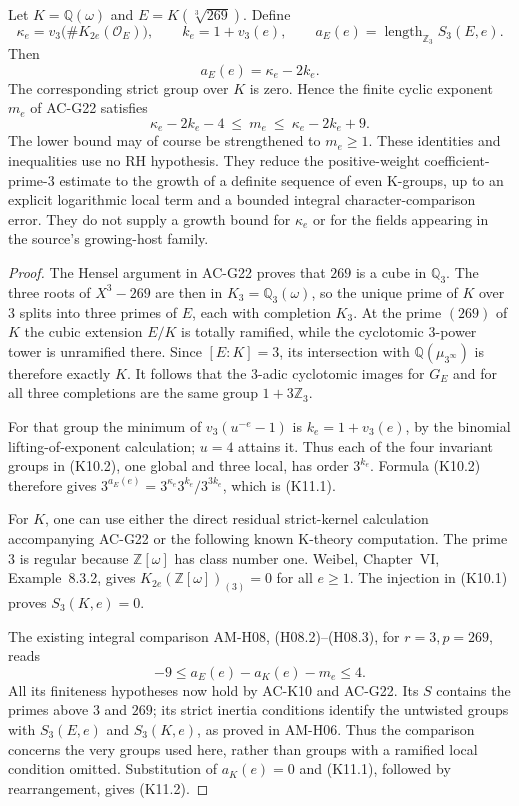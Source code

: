 \begin{proposition}
\label{AC-K11}
Let $K=\mathbb Q(\omega)$ and $E=K(\sqrt[3]{269})$.  Define
\[
 \kappa_e=v_3\bigl(\#K_{2e}(\mathcal O_E)\bigr),\qquad
 k_e=1+v_3(e),\qquad
 a_E(e)=\operatorname{length}_{\mathbb Z_3}S_3(E,e).
\]
Then
\[
                a_E(e)=\kappa_e-2k_e.                  \tag{K11.1}
\]
The corresponding strict group over $K$ is zero.  Hence the
finite cyclic exponent $m_e$ of AC-G22 satisfies
\[
 \kappa_e-2k_e-4\ \leq\ m_e\ \leq\
                       \kappa_e-2k_e+9.               \tag{K11.2}
\]
The lower bound may of course be strengthened to $m_e\geq1$.
These identities and inequalities use no RH hypothesis.
They reduce the positive-weight coefficient-prime-$3$ estimate
to the growth of a definite sequence of even K-groups, up to
an explicit logarithmic local term and a bounded integral
character-comparison error.  They do not supply a growth bound
for $\kappa_e$ or for the fields appearing in the source's
growing-host family.
\end{proposition}
\begin{proof}
The Hensel argument in AC-G22 proves that $269$ is a cube in
$\mathbb Q_3$.  The three roots of $X^3-269$ are then in
$K_3=\mathbb Q_3(\omega)$, so the unique prime of $K$ over $3$
splits into three primes of $E$, each with completion $K_3$.
At the prime $(269)$ of $K$ the cubic extension $E/K$ is
totally ramified, while the cyclotomic $3$-power tower is
unramified there.  Since $[E:K]=3$, its intersection with
$\mathbb Q(\mu_{3^\infty})$ is therefore exactly $K$.
It follows that the $3$-adic cyclotomic images for $G_E$ and
for all three completions are the same group
$1+3\mathbb Z_3$.

For that group the minimum of
$v_3(u^{-e}-1)$ is $k_e=1+v_3(e)$, by the binomial
lifting-of-exponent calculation; $u=4$ attains it.
Thus each of the four invariant groups in (K10.2), one global
and three local, has order $3^{k_e}$.  Formula (K10.2)
therefore gives
$3^{a_E(e)}=3^{\kappa_e}3^{k_e}/3^{3k_e}$,
which is (K11.1).

For $K$, one can use either the direct residual strict-kernel
calculation accompanying AC-G22 or the following known
K-theory computation.  The prime $3$ is regular because
$\mathbb Z[\omega]$ has class number one.  Weibel, Chapter~VI,
Example~8.3.2, gives
$K_{2e}(\mathbb Z[\omega])_{(3)}=0$ for all $e\geq1$.
The injection in (K10.1) proves $S_3(K,e)=0$.

The existing integral comparison AM-H08, (H08.2)--(H08.3),
for $r=3,p=269$, reads
\[
       -9\leq a_E(e)-a_K(e)-m_e\leq4.                 \tag{K11.3}
\]
All its finiteness hypotheses now hold by AC-K10 and AC-G22.
Its $S$ contains the primes above $3$ and $269$; its strict
inertia conditions identify the untwisted groups with
$S_3(E,e)$ and $S_3(K,e)$, as proved in AM-H06.  Thus the
comparison concerns the very groups used here, rather than
groups with a ramified local condition omitted.  Substitution
of $a_K(e)=0$ and (K11.1), followed by rearrangement, gives
(K11.2).
\end{proof}

